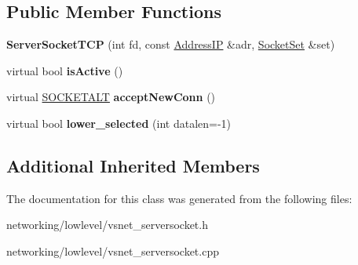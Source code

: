 \subsection*{Public Member Functions}
\begin{DoxyCompactItemize}
\item 
{\bfseries Server\+Socket\+T\+CP} (int fd, const \hyperlink{structAddressIP}{Address\+IP} \&adr, \hyperlink{classSocketSet}{Socket\+Set} \&set)\hypertarget{classServerSocketTCP_a7d236fe63d149dd0068076cb22759a41}{}\label{classServerSocketTCP_a7d236fe63d149dd0068076cb22759a41}

\item 
virtual bool {\bfseries is\+Active} ()\hypertarget{classServerSocketTCP_a9dda3bc23bd17cbf1937020b5898cf69}{}\label{classServerSocketTCP_a9dda3bc23bd17cbf1937020b5898cf69}

\item 
virtual \hyperlink{classSOCKETALT}{S\+O\+C\+K\+E\+T\+A\+LT} {\bfseries accept\+New\+Conn} ()\hypertarget{classServerSocketTCP_abfa686ee3b931a504b6ec2d1dfd11d64}{}\label{classServerSocketTCP_abfa686ee3b931a504b6ec2d1dfd11d64}

\item 
virtual bool {\bfseries lower\+\_\+selected} (int datalen=-\/1)\hypertarget{classServerSocketTCP_a8596753b87449cafc7b851e5d75a2530}{}\label{classServerSocketTCP_a8596753b87449cafc7b851e5d75a2530}

\end{DoxyCompactItemize}
\subsection*{Additional Inherited Members}


The documentation for this class was generated from the following files\+:\begin{DoxyCompactItemize}
\item 
networking/lowlevel/vsnet\+\_\+serversocket.\+h\item 
networking/lowlevel/vsnet\+\_\+serversocket.\+cpp\end{DoxyCompactItemize}
